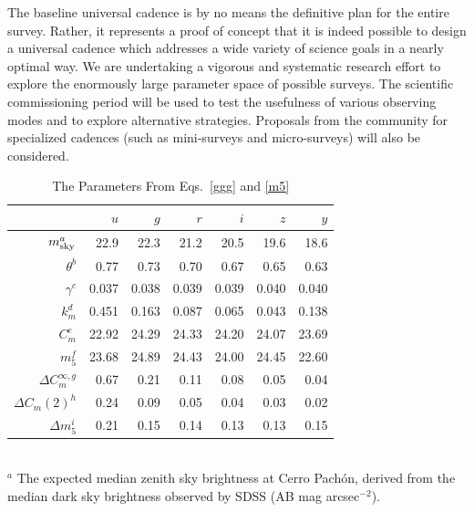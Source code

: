 \documentclass{emulateapj}
\begin{document}
The baseline universal cadence is by no means the definitive plan for the entire
survey. Rather, it represents a proof of concept that it is indeed possible to 
design a universal cadence which addresses a wide variety of science goals in a nearly 
optimal way. We are undertaking a vigorous and systematic research effort to explore 
the enormously large parameter space of possible surveys. The
scientific commissioning period 
will be used to test the usefulness of various observing modes and to explore 
alternative strategies. Proposals from the community
for specialized cadences (such as mini-surveys and
micro-surveys) will also be considered.  



\begin{table}
\caption{The Parameters From Eqs.~\ref{ggg} and \ref{m5}}
\begin{tabular}{|r|r|r|r|r|r|r|}
\hline  
                           &   $u$  &   $g$   & $r$   &  $i$  & $z$  & $y$  \\
\hline  
   $m_{\rm sky}^a$ &   22.9    & 22.3    & 21.2    & 20.5    & 19.6    &  18.6  \\
   $\theta^b$       &   0.77     &  0.73     & 0.70    & 0.67    &  0.65   &  0.63  \\
   $\gamma^c$   &   0.037   & 0.038    & 0.039   & 0.039   & 0.040   & 0.040 \\
    $k_m^d$        &    0.451  &  0.163   &  0.087  &  0.065   &  0.043   &  0.138 \\
    $C_m^e$        &   22.92   & 24.29    & 24.33   & 24.20   & 24.07   & 23.69 \\
    $m_5^f$         &   23.68     &   24.89    & 24.43     &  24.00   & 24.45    & 22.60  \\
 $\Delta C^{\infty,g}_m$  &  0.67   &  0.21     &  0.11   &  0.08   &   0.05  &  0.04  \\ 
 $\Delta C_m(2)^h$       &  0.24   &  0.09     &   0.05  &  0.04   &   0.03  &  0.02 \\   
   $\Delta m_5^i$ &   0.21    & 0.15   & 0.14     &  0.13   & 0.13    & 0.15  \\
\hline                         
\end{tabular}
  \\ \vskip 0.05in
  $^a$ The expected median zenith sky brightness at Cerro Pach\'on, derived from
           the median dark sky brightness observed by SDSS (AB mag arcsec$^{-2}$). \\

\end{table}
\end{document}
